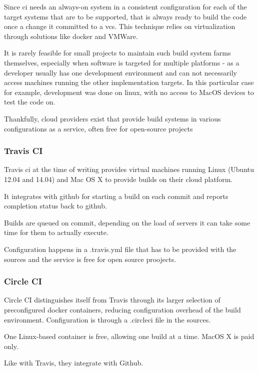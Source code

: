 Since \gls{ci} needs an always-on system in a consistent configuration for each of the target systems that are to be supported, that is always ready to build the code once a change it committed to a \gls{vcs}.
This technique relies on virtualization through solutions like docker and VMWare.

It is rarely feasible for small projects to maintain such build system farms themselves, especially when software is targeted for multiple platforms - as a developer usually has one development environment and can not necessarily access machines running the other implementation targets. In this particular case for example, development was done on linux, with no access to MacOS devices to test the code on.

Thankfully, \gls{cloud} providers exist that provide build systems in various configurations as a service, often free for open-source projects

\subsubsection{Travis CI}
Travis \gls{ci} at the time of writing provides virtual machines running Linux (Ubuntu 12.04 and 14.04) and Mac OS X to provide builds on their cloud platform.

It integrates with github for starting a build on each commit and reports completion status back to github.

Builds are queued on commit, depending on the load of servers it can take some time for them to actually execute.

Configuration happens in a .travis.yml file that has to be provided with the sources and the service is free for open source proojects.

\subsubsection{Circle CI}
Circle CI distinguishes itself from Travis through its larger selection of preconfigured docker containers, reducing configuration overhead of the build environment.
Configuration is through a .circleci file in the sources.

One Linux-based container is free, allowing one build at a time. MacOS X is paid only.

Like with Travis, they integrate with Github.

